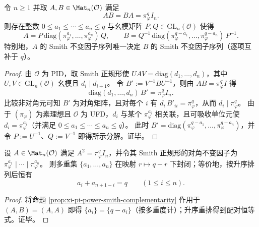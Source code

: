 \begin{proposition}\label{prop:xi-pi-power-smith-complementarity}
令 \(n\ge 1\) 并取 \(A,B\in\Mat_n(\mathcal O)\) 满足
\[
AB=BA=\pi_\varphi^{q}I_n.
\]
则存在整数 \(0\le a_1\le\cdots\le a_n\le q\) 与幺模矩阵 \(P,Q\in\mathrm{GL}_n(\mathcal O)\) 使得
\[
A=P\,\mathrm{diag}(\pi_\varphi^{a_1},\dots,\pi_\varphi^{a_n})\,Q,
\qquad
B=Q^{-1}\,\mathrm{diag}(\pi_\varphi^{q-a_1},\dots,\pi_\varphi^{q-a_n})\,P^{-1}.
\]
特别地，\(A\) 的 Smith 不变因子序列唯一决定 \(B\) 的 Smith 不变因子序列（逐项互补于 \(q\)）。
\end{proposition}
\begin{proof}
由 \(\mathcal O\) 为 PID，取 Smith 正规形使
\(
UAV=\mathrm{diag}(d_1,\dots,d_n)
\)，其中 \(U,V\in\mathrm{GL}_n(\mathcal O)\) 幺模且 \(d_i\mid d_{i+1}\)。
令 \(B':=V^{-1}BU^{-1}\)，则由 \(AB=\pi_\varphi^qI\) 得
\[
\mathrm{diag}(d_1,\dots,d_n)\,B'=\pi_\varphi^q I_n.
\]
比较非对角元可知 \(B'\) 为对角矩阵，且对每个 \(i\) 有 \(d_i\,B'_{ii}=\pi_\varphi^q\)，从而 \(d_i\mid \pi_\varphi^q\)。
由于 \((\pi_\varphi)\) 为素理想且 \(\mathcal O\) 为 UFD，\(d_i\) 与某个 \(\pi_\varphi^{a_i}\) 相关联，且可吸收单位元使 \(d_i=\pi_\varphi^{a_i}\)（并满足 \(0\le a_1\le\cdots\le a_n\le q\)）。
此时 \(B'=\mathrm{diag}(\pi_\varphi^{q-a_1},\dots,\pi_\varphi^{q-a_n})\)，并令 \(P:=U^{-1}\)、\(Q:=V^{-1}\) 即得所示分解。证毕。
\end{proof}

\begin{corollary}\label{cor:xi-smith-spectrum-self-square-root-symmetry}
设 \(A\in\Mat_n(\mathcal O)\) 满足 \(A^2=\pi_\varphi^q I_n\)，并令其 Smith 正规形的对角不变因子为
\(
\pi_\varphi^{a_1}\mid\cdots\mid \pi_\varphi^{a_n}
\)。
则多重集 \(\{a_1,\dots,a_n\}\) 在映射 \(r\mapsto q-r\) 下封闭；等价地，按升序排列后恒有
\[
a_i+a_{n+1-i}=q\qquad(1\le i\le n).
\]
\end{corollary}
\begin{proof}
将命题 \ref{prop:xi-pi-power-smith-complementarity} 作用于 \((A,B)=(A,A)\) 即得 \(\{a_i\}=\{q-a_i\}\)（按多重度计）；升序重排得到配对恒等式。证毕。
\end{proof}

